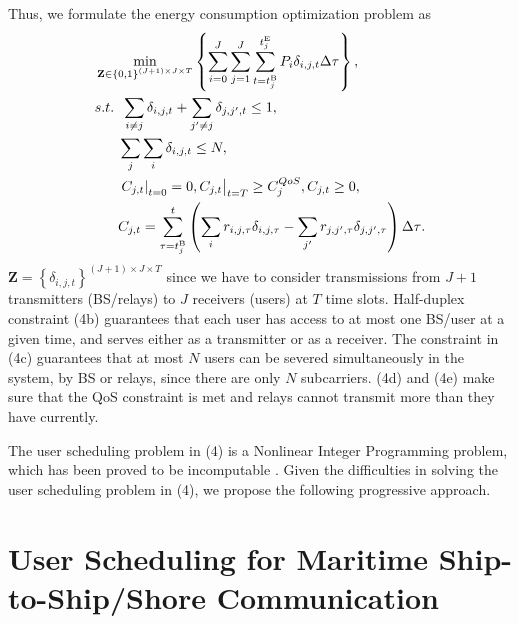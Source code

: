 \documentclass[conference]{IEEEtran}
\begin{document}
Thus, we formulate the energy consumption optimization problem as
\begin{subequations}
\begin{align}
& \mathop {\min }\limits_{{\mathbf{Z}} \in {{\left\{ {0,1} \right\}}^{\left( {J + 1} \right) \times J \times T}}} \left\{ {\sum\limits_{i = 0}^J {\sum\limits_{j = 1}^J {\sum\limits_{t = t_j^{{\rm{B}}}}^{t_j^{{\rm{E}}}} {{P_{i}}\delta _{i,j,t} \Delta \tau } } } } \right\} ,\\
& {s.t.} \;\; \sum\limits_{i \ne j} {{{\delta _{i,j,t}}}  }  + \sum\limits_{j' \ne j} {  {{\delta _{j,j',t}}}  \le {1}} ,\\
& \;\;\;\;\;\; \sum\limits_j {\sum\limits_i {  {{\delta _{i,j,t}}}  } }  \le N ,\\
& \;\;\;\;\;\; {\left. {{{\left. {{C_{j,t}}} \right|}_{t = 0}} = 0, {C_{j,t}}} \right|_{t = T}} \ge C_j^{QoS}, {C_{j,t}} \ge 0, \\
& \;\;\;\;\;\; {C_{j,t}} = \sum\limits_{\tau  = t_j^{{\rm{B}}}}^t {\left( {\sum\limits_i {{r_{i,j,\tau }\delta _{i,j,\tau}}}  - \sum\limits_{j'} {{r_{j,j',\tau }\delta _{j,j',\tau}}} } \right) \Delta \tau } .
\end{align}
\end{subequations}
${\mathbf{Z}}={\left\{ {{\delta _{i,j,t}}} \right\}^{\left( {J + 1} \right) \times J \times T}}$ since we have to consider transmissions from ${J + 1}$ transmitters (BS/relays) to $J$ receivers (users) at $T$ time slots. 
Half-duplex constraint (4b) guarantees that each user has access to at most one BS/user at a given time, and serves either as a transmitter or as a receiver. The constraint in (4c) guarantees that at most $N$ users can be severed simultaneously in the system, by BS or relays, since there are only $N$ subcarriers. (4d) and (4e) make sure that the QoS constraint is met and relays cannot transmit more than they have currently.

The user scheduling problem in (4) is a Nonlinear Integer Programming problem, which has been proved to be incomputable \cite{p420}. Given the difficulties in solving the user scheduling problem in (4), we propose the following progressive approach. 


\section{User Scheduling for Maritime Ship-to-Ship/Shore Communication}\label{sec:3}
\end{document}

